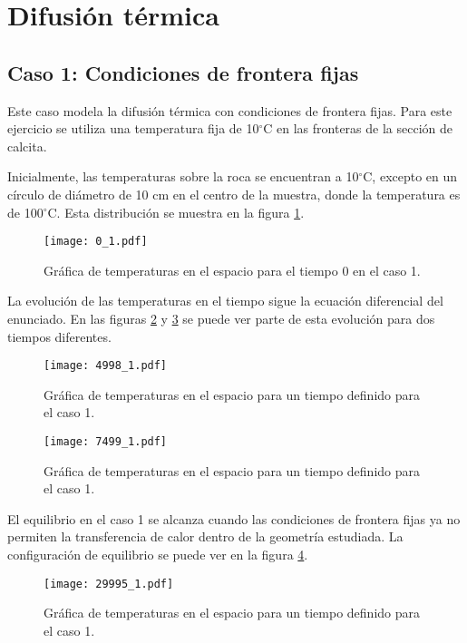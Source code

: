 \documentclass[10pt, twocolumn]{article}
\begin{document}
\section{Difusión térmica}
\subsection{Caso 1: Condiciones de frontera fijas}
Este caso modela la difusión térmica con condiciones de frontera fijas. Para este ejercicio se utiliza una temperatura fija de 10$^\circ$C en las fronteras de la sección de calcita.

Inicialmente, las temperaturas sobre la roca se encuentran a 10$^\circ$C, excepto en un círculo de diámetro de 10 cm en el centro de la muestra, donde la temperatura es de 100$^\circ$C. Esta distribución se muestra en la figura \ref{c1_ini}.
\begin{figure}[h]
\centering
\texttt{[image: 0\_1.pdf]}
\caption{Gráfica de temperaturas en el espacio para el tiempo 0 en el caso 1.}
\label{c1_ini}
\end{figure}
La evolución de las temperaturas en el tiempo sigue la ecuación diferencial del enunciado. En las figuras \ref{c1_g1} y \ref{c1_g2} se puede ver parte de esta evolución para dos tiempos diferentes.
\begin{figure}[htbp]
\centering
\texttt{[image: 4998\_1.pdf]}
\caption{Gráfica de temperaturas en el espacio para un tiempo definido para el caso 1.}
\label{c1_g1}
\end{figure}

\begin{figure}[htbp]
\centering
\texttt{[image: 7499\_1.pdf]}
\caption{Gráfica de temperaturas en el espacio para un tiempo definido para el caso 1.}
\label{c1_g2}
\end{figure}
El equilibrio en el caso 1 se alcanza cuando las condiciones de frontera fijas ya no permiten la transferencia de calor dentro de la geometría estudiada. La configuración de equilibrio se puede ver en la figura \ref{c1_equi}.
\begin{figure}[h]
\centering
\texttt{[image: 29995\_1.pdf]}
\caption{Gráfica de temperaturas en el espacio para un tiempo definido para el caso 1.}
\label{c1_equi}
\end{figure}
\end{document}
